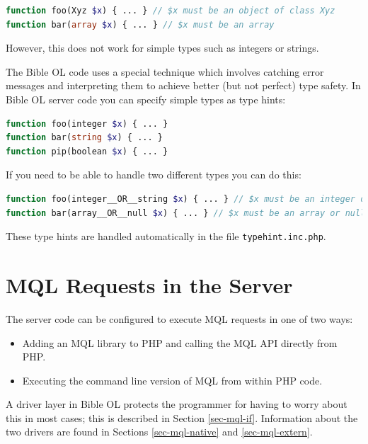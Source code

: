 \documentclass[11pt,oneside,a4paper]{memoir}
\begin{document}
\begin{lstlisting}[language=PHP]
function foo(Xyz $x) { ... } // $x must be an object of class Xyz
function bar(array $x) { ... } // $x must be an array
\end{lstlisting}

However, this does not work for simple types such as integers or strings.

The Bible OL code uses a special technique which involves catching error messages and interpreting them
to achieve better (but not perfect) type safety. In Bible OL server code you can specify simple types as type hints:

\begin{lstlisting}[language=PHP]
function foo(integer $x) { ... }
function bar(string $x) { ... }
function pip(boolean $x) { ... }
\end{lstlisting}

If you need to be able to handle two different types you can do this:

\begin{lstlisting}[language=PHP]
function foo(integer__OR__string $x) { ... } // $x must be an integer or a string
function bar(array__OR__null $x) { ... } // $x must be an array or null
\end{lstlisting}

These type hints are handled automatically in the file \texttt{typehint.inc.php}.



\section{MQL Requests in the Server}\label{sec-mql-server}

The server code can be configured to execute MQL requests in one of two ways:

\begin{itemize}
\item Adding an MQL library to PHP and calling the MQL API directly from PHP.
\item Executing the command line version of MQL from within PHP code.
\end{itemize}

A driver layer in Bible OL protects the programmer for having to worry about this in most cases;
this is described in Section \ref{sec-mql-if}. Information about the two drivers are found in Sections
\ref{sec-mql-native} and \ref{sec-mql-extern}.
\end{document}
